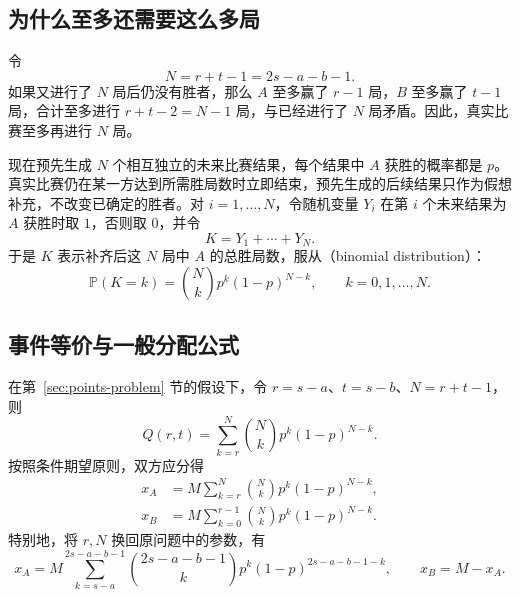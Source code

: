 \documentclass[UTF8]{ctexbook}
\begin{document}
\subsection{为什么至多还需要这么多局}

令
\begin{equation}
  N=r+t-1=2s-a-b-1.
  \label{eq:points-horizon}
\end{equation}
如果又进行了 $N$ 局后仍没有胜者，那么 $A$ 至多赢了 $r-1$ 局，$B$ 至多赢了 $t-1$ 局，合计至多进行 $r+t-2=N-1$ 局，与已经进行了 $N$ 局矛盾。因此，真实比赛至多再进行 $N$ 局。

现在预先生成 $N$ 个相互独立的未来比赛结果，每个结果中 $A$ 获胜的概率都是 $p$。真实比赛仍在某一方达到所需胜局数时立即结束，预先生成的后续结果只作为假想补充，不改变已确定的胜者。对 $i=1,\ldots,N$，令随机变量 $Y_i$ 在第 $i$ 个未来结果为 $A$ 获胜时取 $1$，否则取 $0$，并令
\[
  K=Y_1+\cdots+Y_N.
\]
于是 $K$ 表示补齐后这 $N$ 局中 $A$ 的总胜局数，服从（binomial distribution）：
\begin{equation}
  \mathbb P(K=k)=\binom Nk p^k(1-p)^{N-k},
  \qquad k=0,1,\ldots,N.
  \label{eq:points-binomial-mass}
\end{equation}

\subsection{事件等价与一般分配公式}

\begin{proposition}[赌本分配的一般公式]
\label{prop:points-general-shares}
在第~\ref{sec:points-problem} 节的假设下，令 $r=s-a$、$t=s-b$、$N=r+t-1$，则
\begin{equation}
  Q(r,t)=\sum_{k=r}^{N}\binom Nk p^k(1-p)^{N-k}.
  \label{eq:points-binomial-tail}
\end{equation}
按照条件期望原则，双方应分得
\begin{equation}
  \boxed{
  \begin{aligned}
    x_A&=M\sum_{k=r}^{N}\binom Nk p^k(1-p)^{N-k},\\
    x_B&=M\sum_{k=0}^{r-1}\binom Nk p^k(1-p)^{N-k}.
  \end{aligned}}
  \label{eq:points-general-shares}
\end{equation}
特别地，将 $r,N$ 换回原问题中的参数，有
\begin{equation}
  x_A=M\sum_{k=s-a}^{2s-a-b-1}
    \binom{2s-a-b-1}{k}p^k(1-p)^{2s-a-b-1-k},
  \qquad x_B=M-x_A.
  \label{eq:points-original-parameters}
\end{equation}
\end{proposition}
\end{document}
